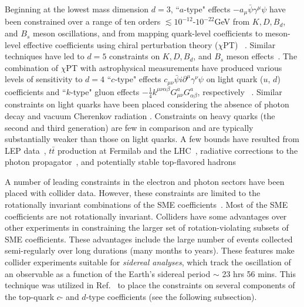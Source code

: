 Beginning at the lowest mass dimension $d = 3$, 
``$a$-type" effects $-a_\mu \bar\psi \gamma^\mu \psi$ 
have been constrained over a range of ten orders 
$\lesssim 10^{-12}$-$10^{-22}$\;GeV from 
$K, D, B_d$, and $B_s$ meson oscillations, and
from mapping quark-level coefficients to meson-level effective
coefficients using chiral perturbation theory ($\chi$PT)
~\cite{Kostelecky:1997mh, Kostelecky:1999bm, Kostelecky:2000ku, 
Isgur:2001yz, Nguyen:2001tg, Babusci:2013gda, Kostelecky:2001ff, 
Aubert:2007bp, Kostelecky:2010bk, Abazov:2015ana, 
Aaij:2016mos, Roberts:2017tmo, Schubert:2016xul,Altschul:2019beo}. 
Similar techniques have led to $d=5$ constraints 
on $K, D, B_d$, and $B_s$ meson 
effects~\cite{Edwards:2018lsn, Edwards:2019lfb}. 
The combination of $\chi$PT with 
astrophysical measurements have produced
various levels of sensitivity to 
$d=4$ ``$c$-type" effects $c_{\mu\nu}\bar\psi i\partial^\mu\gamma^\nu \psi$ 
on light quark ($u$, $d$) coefficients and 
``$k$-type" gluon effects 
$-\tfrac{1}{4}k^{\mu\nu\alpha\beta}G^{a}_{\mu\nu}G^{a}_{\alpha\beta}$, respectively
~\cite{Kamand:2016xhv,Kamand:2017bzl,Altschul:2019beo,
Noordmans:2016pkr,Noordmans:2017kji}. 
Similar constraints on light quarks 
have been placed considering 
the absence of photon decay 
and vacuum Cherenkov radiation 
\cite{Gagnon:2004xh, Altschul:2006uw, Kostelecky:2013rta, Schreck:2017isa}. 
Constraints on heavy quarks (the second and third generation)
are few in comparison and are typically
substantially weaker than those on light quarks. 
A few bounds have resulted from LEP 
data~\cite{Karpikov:2016qvq}, 
$t\bar t$ production at Fermilab 
and the LHC~\cite{Berger:2015yha,Abazov:2012iu,Carle:2019ouy},
radiative corrections to the photon propagator~\cite{Satunin:2017wmk}, 
and potentially stable top-flavored hadrons~\cite{Altschul:2020wkw}

A number of leading constraints in the electron
and photon sectors have been placed with collider data. 
However, these constraints are limited to the
rotationally invariant combinations 
of the SME coefficients~\cite{Altschul:2009xh,Altschul:2010na,kl19}.
Most of the SME coefficients are not rotationally invariant.
Colliders have some advantages over other experiments
in constraining the larger set of rotation-violating subsets 
of SME coefficients. These advantages include
the large number of events collected semi-regularly
over long durations (many months to years). 
These features make collider experiments suitable for 
\textit{sidereal analyses}, which track the oscillation of
an observable as a function of the Earth's 
sidereal period $\sim$ 23 hrs 56 mins. 
This technique was utilized in Ref.~\cite{Abazov:2012iu}
to place the constraints on several components 
of the top-quark $c$- and $d$-type 
coefficients (see the following subsection).

